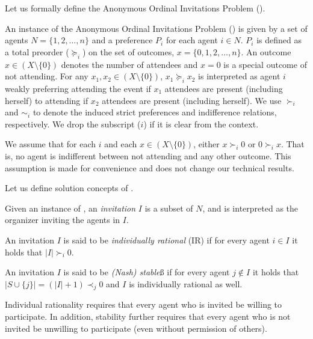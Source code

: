 Let us formally define the Anonymous Ordinal Invitations Problem (\AOIP).

\begin{definition}
An instance of the Anonymous Ordinal Invitations Problem (\AOIP) is given by a set of agents $N = \{1, 2, \dots, n\}$ and a preference $P_i$ for each agent $i\in N$. $P_i$ is defined as a total preorder ($\succeq_i$) on the set of outcomes, $x = \{0, 1, 2, \dots, n\}$. An outcome $x\in (X\setminus\{0\})$ denotes the number of attendees and $x = 0$ is a special outcome of not attending. 
For any $x_1, x_2\in (X \setminus\{0\})$, $x_1 \succeq_i x_2$ is interpreted as agent $i$ weakly preferring attending the event if $x_1$ attendees are present (including herself) to attending if $x_2$ attendees are present (including herself).
We use $\succ_i$ and $\sim_i$ to denote the induced strict preferences and indifference relations, respectively. 
We drop the subscript ($i$) if it is clear from the context.
\end{definition}

We assume that for each $i$ and each $x\in (X\setminus\{0\})$, either $x \succ_i 0$ or $0 \succ_i x$. That is, no agent is indifferent between not attending and any other outcome. This assumption is made for convenience and does not change our technical results.

Let us define solution concepts of \AOIP.

\begin{definition} \label{GT:def:invitation}
Given an instance of \AOIP, an \emph{invitation} $I$ is a subset of $N$, and is interpreted as the organizer inviting the agents in $I$. 

An invitation $I$ is said to be \emph{individually rational} (IR) if for every agent $i\in I$ it holds that $|I| \succ_i 0$. 

An invitation $I$ is said to be \emph{(Nash) stable}ß if for every agent $j\not\in I$ it holds that $|S \cup \{j\}| = (|I| + 1) \prec_j 0$ and $I$ is individually rational as well.
\end{definition}
Individual rationality requires that every agent who is invited be willing to participate. In addition, stability further requires that every agent who is not invited be unwilling to participate (even without permission of others).


